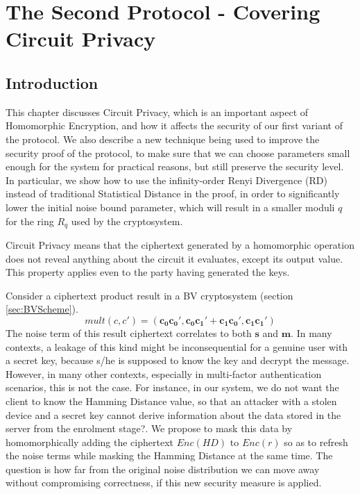 \chapter{The Second Protocol - Covering Circuit Privacy}
\label{chap:renyiDivergence}

\ifpdf
    \graphicspath{{Chapter4/Figs/Raster/}{Chapter4/Figs/PDF/}{Chapter4/Figs/}}
\else
    \graphicspath{{Chapter4/Figs/Vector/}{Chapter4/Figs/}}
\fi

\section{Introduction}
\label{sec:secProcIntro}
This chapter discusses Circuit Privacy, which is an important aspect of
Homomorphic Encryption, and how it affects the security of our first variant
of the protocol. We also describe a new technique being used to improve the
security proof of the protocol, to make sure that we can choose parameters small
enough for the system for practical reasons, but still preserve the security level. In
particular, we show how to use the infinity-order Renyi Divergence (RD) instead of
traditional Statistical Distance in the proof, in order to significantly lower the initial noise bound parameter, which will result in a smaller moduli \(q\) for the ring \(R_{q}\) used by the
cryptosystem.

Circuit Privacy means that the ciphertext generated by a homomorphic operation
does not reveal anything about the circuit it evaluates, except its output
value. This property applies even to the party having generated the
keys.

Consider a ciphertext product result in a BV cryptosystem (section
\ref{sec:BVScheme}).
\[
  mult(c,c') = (\mathbf{c_0}\mathbf{c_0'}, \mathbf{c_0}\mathbf{c_1'} +
  \mathbf{c_1}\mathbf{c_0'}, \mathbf{c_1}\mathbf{c_1'})
\]
The noise term of this result ciphertext correlates to both $\mathbf{s}$ and $\mathbf{m}$.
In many contexts, a leakage of this kind might be inconsequential for a genuine user with a secret key, because s/he is supposed to know the key and decrypt the message.
However, in many other contexts, especially in multi-factor authentication
scenarios, this is not the case. For instance, in our system, we do not want the
client to know the Hamming Distance value, so that an attacker with a stolen
device and a secret key cannot derive information about the data stored in the
server from the enrolment stage?. We propose to mask this data by homomorphically adding the ciphertext
$Enc(HD)$ to $Enc(r)$ so as to refresh the noise terms while masking the Hamming Distance at the same time. The question is how far from the original noise distribution we can move away without compromising correctness, if this new security measure is applied.


